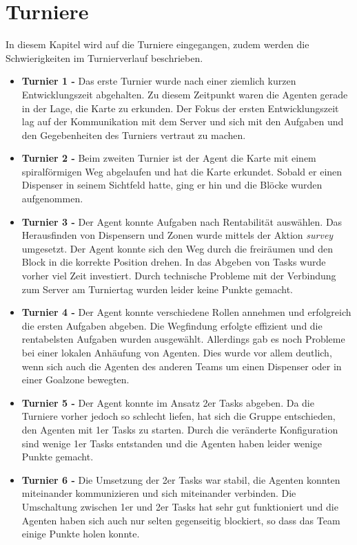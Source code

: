 \section{Turniere}
In diesem Kapitel wird auf die Turniere eingegangen, zudem werden die Schwierigkeiten im Turnierverlauf beschrieben.

\begin{itemize}
    \item \textbf{Turnier 1 -} 
	Das erste Turnier wurde nach einer ziemlich kurzen Entwicklungszeit abgehalten. Zu diesem Zeitpunkt waren die Agenten gerade in der Lage, die Karte zu erkunden. Der Fokus der ersten Entwicklungszeit lag auf der Kommunikation mit dem Server und sich mit den Aufgaben und den Gegebenheiten des Turniers vertraut zu machen. 
	
	\item \textbf{Turnier 2 -} Beim zweiten Turnier ist der Agent die Karte mit einem spiralförmigen Weg abgelaufen und hat die Karte erkundet. Sobald er einen Dispenser in seinem Sichtfeld hatte, ging er hin und die Blöcke wurden aufgenommen. 

	\item \textbf{Turnier 3 -} Der Agent konnte Aufgaben nach Rentabilität auswählen. Das Herausfinden von Dispensern und Zonen wurde mittels der Aktion \emph{survey} umgesetzt. Der Agent konnte sich den Weg durch die \Obstacles freiräumen und den Block in die korrekte Position drehen.
	In das Abgeben von Tasks wurde vorher viel Zeit investiert. Durch technische Probleme mit der Verbindung zum Server am Turniertag wurden leider keine Punkte gemacht. 
	
	\item \textbf{Turnier 4 -} Der Agent konnte verschiedene Rollen annehmen und erfolgreich die ersten Aufgaben abgeben. Die Wegfindung erfolgte effizient und die rentabelsten Aufgaben wurden ausgewählt. Allerdings gab es noch Probleme bei einer lokalen Anhäufung von Agenten. Dies wurde vor allem deutlich, wenn sich auch die Agenten des anderen Teams um einen Dispenser oder in einer Goalzone bewegten.
	
	\item \textbf{Turnier 5 -} Der Agent konnte im Ansatz 2er Tasks abgeben. Da die Turniere vorher jedoch so schlecht liefen, hat sich die Gruppe entschieden, den Agenten mit 1er Tasks zu starten. Durch die veränderte Konfiguration sind wenige 1er Tasks entstanden und die Agenten haben leider wenige Punkte gemacht. 

	\item \textbf{Turnier 6 -} 	Die Umsetzung der 2er Tasks war stabil, die Agenten konnten miteinander kommunizieren und sich miteinander verbinden. Die Umschaltung zwischen 1er und 2er Tasks hat sehr gut funktioniert und die Agenten haben sich auch nur selten gegenseitig blockiert, so dass das Team einige Punkte holen konnte. 

\end{itemize}

